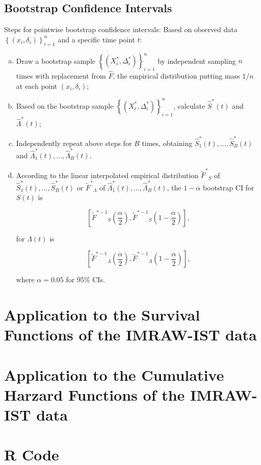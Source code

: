 \documentclass[11pt]{article}
\newcommand{\hsS}{\hat{S}^{*}}
\newcommand{\hsLam}{\hat{\Lambda}^{*}}
\newcommand{\hF}{\hat{F}}
\newcommand{\tsF}{{\tilde{F}^{*}}}
\newcommand{\invtsF}{{\tilde{F}^{*-1}}}
\begin{document}
\subsection{Bootstrap Confidence Intervals}
Steps for pointwise bootstrap confidence intervals:
Based on observed data $\left\{ (x_i,\delta_i) \right\}_{i=1}^n$ and a specific
time point $t$:
\begin{enumerate}[(a)]
\item Draw a bootstrap sample $\left\{ (X_i^{*},\Delta_i^{*}) \right\}_{i=1}^n$
  by independent sampling $n$ times with replacement from $\hF$, the empirical
  distribution putting mass $1/n$ at each point $(x_i,\delta_i)$;
\item Based on the bootstrap sample $\left\{ (X_i^{*},\Delta_i^{*})
  \right\}_{i=1}^n$, calculate $\hsS (t)$ and $\hsLam (t)$;
\item Independently repeat above steps for $B$ times, obtaining
  $\hsS_1(t),\dots, \hsS_B(t)$ and $\hsLam_1(t),\dots,\hsLam_B(t)$.
\item According to the linear interpolated empirical distribution $\tsF_S$ of
  $\hsS_1(t),\dots, \hsS_B(t)$ or $\tsF_{\Lambda}$ of
  $\hsLam_1(t),\dots,\hsLam_B(t)$, the $1-\alpha$ bootstrap CI for $S(t)$ is

\begin{equation*}
  \left[\invtsF_S\left(\frac{\alpha}{2}\right), \invtsF_S\left(1-\frac{\alpha}{2}\right)\right],
\end{equation*}

  for $\Lambda (t)$ is 
  
\begin{equation*}
\left[\invtsF_{\Lambda}\left(\frac{\alpha}{2}\right), \invtsF_{\Lambda}\left(1-\frac{\alpha}{2}\right)\right],
\end{equation*}

where $\alpha = 0.05$ for $95\%$ CIs.

\end{enumerate}

\section{Application to the Survival Functions of the IMRAW-IST data}

\section{Application to the Cumulative Harzard Functions of the IMRAW-IST data}

\appendix

\section{R Code}
\end{document}
